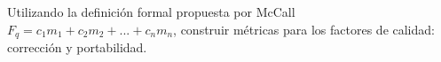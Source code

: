 Utilizando la definición formal propuesta por McCall $F_q = c_1m_1 + c_2m_2 + ... + c_nm_n$, construir métricas para los factores de calidad: corrección y portabilidad.
